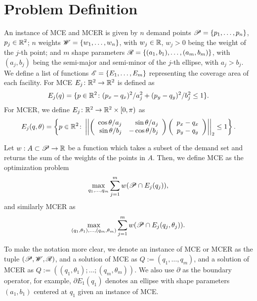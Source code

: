 	\section{Problem Definition}
	
	An instance of MCE and MCER is given by $n$ demand points $\mathscr{P}=\{p_1, \dots, p_n\}$, $p_j\in\mathbb{R}^2$; $n$ weights $\mathscr{W}=\{w_1, \dots, w_n\}$, with $w_j\in\mathbb{R}$, $w_j>0$ being the weight of the $j$-th point; and $m$ shape parameters $\mathscr{R}=\{(a_1, b_1), \dots, (a_m, b_m)\}$, with $(a_j, b_j)$ being the semi-major and semi-minor of the $j$-th ellipse, with $a_j > b_j$. We define a list of functions $\mathscr{E}=\{E_1, \dots, E_m\}$ representing the coverage area of each facility. For MCE $E_j\colon\mathbb{R}^2\to\mathbb{R}^2$ is defined as
	\begin{equation}
	E_j(q) = \{p \in \mathbb{R}^2 \colon (p_x-q_x)^2/a_j^2 + (p_y-q_y)^2/b_j^2 \le 1\}.
	\end{equation}
	For MCER, we define $E_j \colon \mathbb{R}^2 \to \mathbb{R}^2 \times [0, \pi)$ as
	\begin{equation}
		E_j(q, \theta) = \left\{p \in \mathbb{R}^2 \colon 
		\left|\left|
		\left(
		\begin{array}{rr}
		\cos{\theta}/a_j & \sin{\theta}/a_j\\
		\sin{\theta}/b_j & -\cos{\theta}/b_j
		\end{array}
		\right)
		\left(
		\begin{array}{c}
		p_x-q_x\\
		p_y-q_y
		\end{array}
		\right)
		\right|\right|_2
		\le 1
		\right\}.
	\end{equation}
	
Let $w : A \subset \mathscr{P} \to \mathbb{R}$ be a function which takes a subset of the demand set and returns the sum of the weights of the points in $A$. Then, we define MCE as the optimization problem 
\begin{equation}
\max_{q_1, \dots, q_m} \sum_{j=1}^m w(\mathscr{P} \cap E_j(q_j)),
\end{equation}
and similarly MCER as
\begin{equation}
\max_{(q_1, \theta_1), \dots, (q_m, \theta_m)} \sum_{j=1}^m w(\mathscr{P} \cap E_j(q_j, \theta_j)).
\end{equation}

To make the notation more clear, we denote an instance of MCE or MCER as the tuple $(\mathscr{P}, \mathscr{W}, \mathscr{R})$, and a solution of MCE as $Q:=(q_1, \dots, q_m)$, and a solution of MCER as $Q:=((q_1, \theta_1); \dots; (q_m, \theta_m))$. We also use $\partial$ as the boundary operator, for example, $\partial E_1(q_1)$ denotes an ellipse with shape parameters $(a_1, b_1)$ centered at $q_1$ given an instance of MCE.